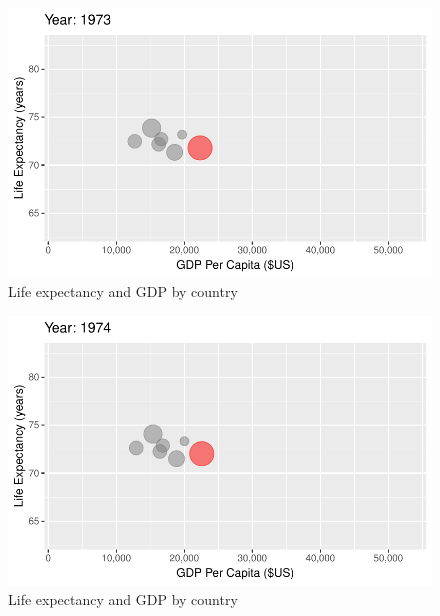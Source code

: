 \documentclass[
  letterpaper,
  DIV=11,
  numbers=noendperiod]{scrreport}
\theoremstyle{definition}
\theoremstyle{remark}
\begin{document}
\begin{figure}

{\centering \includegraphics{index_files/figure-pdf/fig-anim-country-39.pdf}

}

\caption{\label{fig-anim-country-39}Life expectancy and GDP by country}

\end{figure}

\begin{figure}

{\centering \includegraphics{index_files/figure-pdf/fig-anim-country-40.pdf}

}

\caption{\label{fig-anim-country-40}Life expectancy and GDP by country}

\end{figure}
\end{document}
